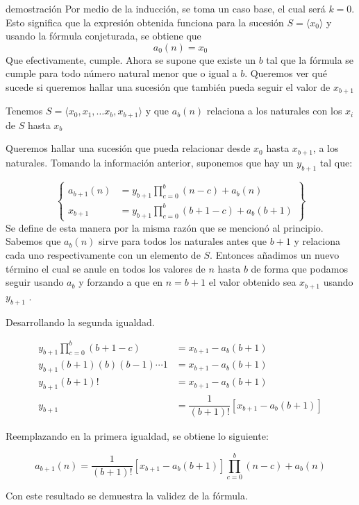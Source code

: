 \begin{subproofbox}{demostración}
    Por medio de la inducción, se toma un caso base, el cual será $k=0$. Esto significa que la expresión obtenida funciona para la sucesión $S = \langle x_0\rangle$
    y usando la fórmula conjeturada, se obtiene que
    \[a_0(n) = x_0 \]
    Que efectivamente, cumple.
    Ahora se supone que existe un $b$ tal que la fórmula se cumple para todo número natural menor que o igual a $b$. Queremos ver qué sucede si queremos hallar una sucesión que también pueda seguir el valor de $x_{b+1}$

    Tenemos $S = \langle x_0, x_1, \dots x_b, x_{b+1}\rangle$
    y que $a_b(n)$ relaciona a los naturales con los $x_i$ de $S$ hasta $x_b$

    Queremos hallar una sucesión que pueda relacionar desde $x_0$ hasta $x_{b+1}$, a los naturales. Tomando la información anterior, suponemos que hay un $y_{b+1}$ tal que:

    \begin{equation*}
        \left\{
            \begin{aligned}
                a_{b+1}(n) &= y_{b+1} \displaystyle\prod_{c=0}^{b}(n-c) + a_b(n)\\
                x_{b+1} &= y_{b+1} \displaystyle\prod_{c=0}^{b}(b+1 - c) + a_b(b + 1)                
            \end{aligned}
        \right\}
    \end{equation*}
    Se define de esta manera por la misma razón que se mencionó al principio. Sabemos que $a_b(n)$ sirve para todos los naturales antes que $b+1$ y relaciona cada uno respectivamente con un elemento de $S$. Entonces añadimos un nuevo término el cual se anule en todos los valores de $n$ hasta $b$ de forma que podamos seguir usando $a_b$ y forzando a que en $n=b+1$ el valor obtenido sea $x_{b+1}$ usando $y_{b+1}$ .

    Desarrollando la segunda igualdad.

    \begin{align*}
        y_{b+1} \displaystyle\prod_{c=0}^{b}(b+1 - c) &= x_{b+1} - a_b(b+1)\\
        y_{b+1} (b+1)(b)(b-1)\cdots 1 &= x_{b+1} - a_b(b+1)\\
        y_{b+1} (b+1)! &= x_{b+1} - a_b(b+1)\\
        y_{b+1} &= \dfrac{1}{(b+1)!}[x_{b+1} - a_b(b+1)]
    \end{align*}

    Reemplazando en la primera igualdad, se obtiene lo siguiente:

    \[a_{b+1}(n) = \dfrac{1}{(b+1)!}[x_{b+1} - a_b(b+1)]\displaystyle\prod_{c=0}^{b}(n-c) + a_b(n)\]

    Con este resultado se demuestra la validez de la fórmula.
\end{subproofbox}